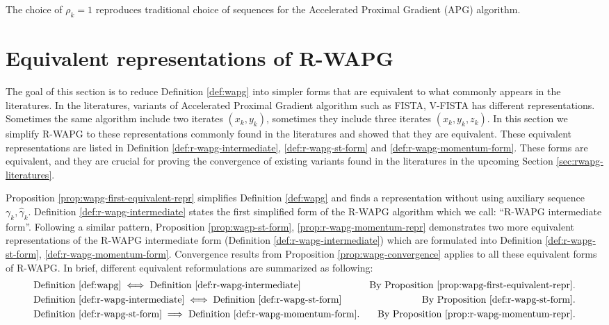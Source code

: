 \documentclass[12pt]{article}
\begin{document}
    \begin{remark}
        The choice of $\rho_k = 1$ reproduces traditional choice of sequences for the Accelerated Proximal Gradient (APG) algorithm.
    \end{remark}


\section{Equivalent representations of R-WAPG}\label{sec:rwapg-equiv-repr}
    The goal of this section is to reduce Definition \ref{def:wapg} into simpler forms that are equivalent to what commonly appears in the literatures.
    In the literatures, variants of Accelerated Proximal Gradient algorithm such as FISTA, V-FISTA has different representations.
    Sometimes the same algorithm include two iterates $(x_k, y_k)$, sometimes they include three iterates $(x_k, y_k, z_k)$.
    In this section we simplify R-WAPG to these representations commonly found in the literatures and showed that they are equivalent.
    These equivalent representations are listed in Definition \ref{def:r-wapg-intermediate}, \ref{def:r-wapg-st-form} and \ref{def:r-wapg-momentum-form}.
    These forms are equivalent, and they are crucial for proving the convergence of existing variants found in the literatures in the upcoming Section \ref{sec:rwapg-literatures}.
    \par
    Proposition \ref{prop:wapg-first-equivalent-repr} simplifies Definition \ref{def:wapg} and finds a representation without using auxiliary sequence $\gamma_k, \hat \gamma_k$.
    Definition \ref{def:r-wapg-intermediate} states the first simplified form of the R-WAPG algorithm which we call: ``R-WAPG intermediate form''.
    Following a similar pattern, Proposition \ref{prop:wagp-st-form}, \ref{prop:r-wapg-momentum-repr} demonstrates two more equivalent representations of the R-WAPG intermediate form (Definition \ref{def:r-wapg-intermediate}) which are formulated into Definition \ref{def:r-wapg-st-form}, \ref{def:r-wapg-momentum-form}.
    Convergence results from Proposition \ref{prop:wapg-convergence} applies to all these equivalent forms of R-WAPG.
    In brief, different equivalent reformulations are summarized as following:
    \begin{align*}
        &\text{Definition \ref{def:wapg}}   \iff
        \text{Definition \ref{def:r-wapg-intermediate}}  & \text{By Proposition \ref{prop:wapg-first-equivalent-repr}.}
        \\
        & \text{Definition \ref{def:r-wapg-intermediate}}
        \iff \text{Definition \ref{def:r-wapg-st-form}} & \text{By Proposition \ref{def:r-wapg-st-form}.}
        \\
        &
        \text{Definition \ref{def:r-wapg-st-form}}\implies
        \text{Definition }\ref{def:r-wapg-momentum-form}.
        & \text{By Proposition }\ref{prop:r-wapg-momentum-repr}.
    \end{align*}
\end{document}

